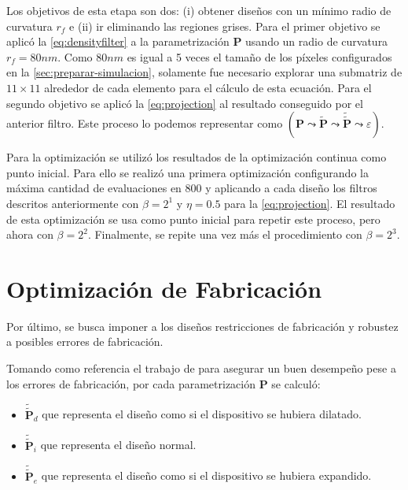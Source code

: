 Los objetivos de esta etapa son dos: (i) obtener diseños con un mínimo radio de curvatura $r_f$ e
(ii) ir eliminando las regiones grises.
Para el primer objetivo se aplicó la \autoref{eq:densityfilter} a la parametrización 
$\boldsymbol{P}$ usando un radio de curvatura $r_f = 80 nm$.
Como $80nm$ es igual a 5 veces el tamaño de los píxeles configurados en la \autoref{sec:preparar-simulacion},
solamente fue necesario explorar una submatriz de $11 \times 11$ alrededor de cada elemento para el cálculo de
esta ecuación.
Para el segundo objetivo se aplicó la \autoref{eq:projection} al resultado conseguido por el anterior filtro.
Este proceso lo podemos representar como 
$(\boldsymbol{P} \mathrel{\leadsto} \widetilde{\boldsymbol{P}} \mathrel{\leadsto}
\widetilde{\widetilde{\boldsymbol{P}}} \mathrel{\leadsto} \varepsilon)$.

Para la optimización se utilizó los resultados de la optimización continua como punto inicial.
Para ello se realizó una primera optimización configurando la máxima cantidad de evaluaciones 
en 800 y aplicando a cada diseño los filtros descritos anteriormente con $\beta = 2^1$ y $\eta = 0.5$
para la \autoref{eq:projection}.
El resultado de esta optimización se usa como punto inicial para repetir este proceso, pero ahora con $\beta
= 2^2$. Finalmente, se repite una vez más el procedimiento con $\beta = 2^3$.

\section{Optimización de Fabricación}

Por último, se busca imponer a los diseños restricciones de fabricación y robustez a posibles errores
de fabricación. 

Tomando como referencia el trabajo de \cite{Hammond20} para asegurar un buen desempeño pese a los errores de
fabricación, por cada parametrización $\boldsymbol{P}$ se calculó:

\begin{itemize}
  \item $\widetilde{\widetilde{\boldsymbol{P}}}_{d}$ que representa el diseño como si el dispositivo se hubiera dilatado.
  \item $\widetilde{\widetilde{\boldsymbol{P}}}_{i}$ que representa el diseño normal.
  \item $\widetilde{\widetilde{\boldsymbol{P}}}_{e}$  que representa el diseño como si el dispositivo se
    hubiera expandido.
\end{itemize}

